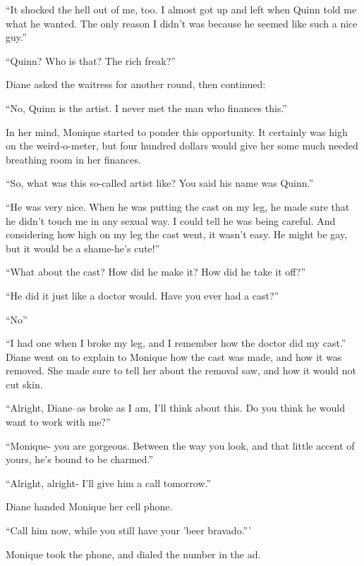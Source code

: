 ``It shocked the hell out of me, too. I almost got up and left when Quinn told me what he
wanted. The only reason I didn't was because he seemed like such a nice guy.''

``Quinn? Who is that? The rich freak?''

Diane asked the waitress for another round, then continued:

``No, Quinn is the artist. I never met the man who finances this.''

In her mind, Monique started to ponder this opportunity. It certainly was high on the
weird-o-meter, but four hundred dollars would give her some much needed breathing room in her
finances.

``So, what was this so-called artist like? You said his name was Quinn.''

``He was very nice. When he was putting the cast on my leg, he made sure that he didn't touch me
in any sexual way. I could tell he was being careful. And considering how high on my leg the
cast went, it wasn't easy. He might be gay, but it would be a shame-he's cute!''

``What about the cast? How did he make it? How did he take it off?''

``He did it just like a doctor would. Have you ever had a cast?''

``No''

``I had one when I broke my leg, and I remember how the doctor did my cast.'' Diane went on to
explain to Monique how the cast was made, and how it was removed. She made sure to tell her
about the removal saw, and how it would not cut skin.

``Alright, Diane--as broke as I am, I'll think about this. Do you think he would want to work
with me?''

``Monique- you are gorgeous. Between the way you look, and that little accent of yours, he's
bound to be charmed.''

``Alright, alright- I'll give him a call tomorrow.''

Diane handed Monique her cell phone.

``Call him now, while you still have your 'beer bravado.'''

Monique took the phone, and dialed the number in the ad.
